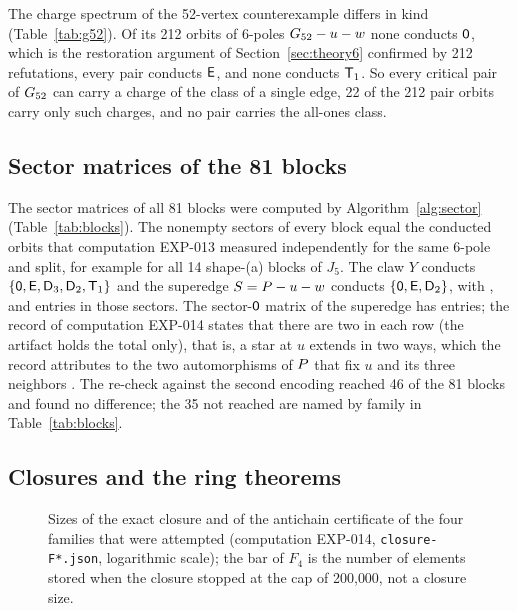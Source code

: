 

The charge spectrum of the 52-vertex counterexample differs in kind (Table~\ref{tab:g52}). Of its 212 orbits of 6-poles $G_{52} - u - w$ none
conducts $\mathsf{0}$, which is the restoration argument of Section~\ref{sec:theory6} confirmed by 212 refutations, every pair conducts $\mathsf{E}$, and none conducts
$\mathsf{T}_1$. So every critical pair of $G_{52}$ can carry a charge of the class of a single edge, 22 of the 212 pair orbits carry only such charges, and no
pair carries the all-ones class.

\subsection{Sector matrices of the 81 blocks}\label{sec:blocks}



The sector matrices of all 81 blocks were computed by Algorithm~\ref{alg:sector} (Table~\ref{tab:blocks}). The nonempty sectors of every block
equal the conducted orbits that computation EXP-013 measured independently for the same 6-pole and split, for example for all 14 shape-(a) blocks of $J_5$. The claw $Y$
conducts $\{\mathsf{0}, \mathsf{E}, \mathsf{D}_3, \mathsf{D}_2, \mathsf{T}_1\}$ and the superedge $S = P - u - w$ conducts $\{\mathsf{0}, \mathsf{E}, \mathsf{D}_2\}$, with \nSuperedgeZero, \nSuperedgeE{} and
\nSuperedgeDtwo{} entries in those sectors. The sector-$\mathsf{0}$ matrix of the superedge has \nSuperedgeZero{} entries; the record of computation EXP-014 states that there are two in each row (the artifact holds the total only), that is, a star at $u$ extends in two ways,
which the record attributes to the two automorphisms of $P$ that fix $u$ and its three neighbors . The re-check against the second encoding reached 46 of the 81 blocks
and found no difference; the 35 not reached are named by family in Table~\ref{tab:blocks}.

\subsection{Closures and the ring theorems}\label{sec:closures}



\begin{figure}[t]\centering

\caption{Sizes of the exact closure and of the antichain certificate of the four families that were attempted (computation EXP-014, \texttt{closure-F*.json}, logarithmic scale);
the bar of $F_4$ is the number of elements stored when the closure stopped at the cap of 200{,}000, not a closure size.}\label{fig:closures}
\end{figure}


